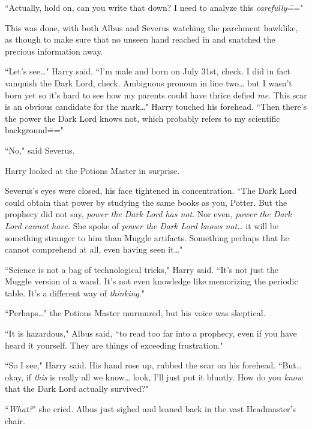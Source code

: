 ``Actually, hold on, can you write that down? I need to analyze this \emph{carefully}\==="

This was done, with both Albus and Severus watching the parchment hawklike, as though to make sure that no unseen hand reached in and snatched the precious information away.

``Let's see{\ldots}" Harry said. ``I'm male and born on July 31st, check. I did in fact vanquish the Dark Lord, check. Ambiguous pronoun in line two{\ldots} but I wasn't born yet so it's hard to see how my parents could have thrice defied \emph{me}. This scar is an obvious candidate for the mark{\ldots}" Harry touched his forehead. ``Then there's the power the Dark Lord knows not, which probably refers to my scientific background\==="

``No," said Severus.

Harry looked at the Potions Master in surprise.

Severus's eyes were closed, his face tightened in concentration. ``The Dark Lord could obtain that power by studying the same books as you, Potter. But the prophecy did not say, \emph{power the Dark Lord has not}. Nor even, \emph{power the Dark Lord cannot have}. She spoke of \emph{power the Dark Lord knows not{\ldots}} it will be something stranger to him than Muggle artifacts. Something perhaps that he cannot comprehend at all, even having seen it{\ldots}"

``Science is not a bag of technological tricks," Harry said. ``It's not just the Muggle version of a wand. It's not even knowledge like memorizing the periodic table. It's a different way of \emph{thinking}."

``Perhaps{\ldots}" the Potions Master murmured, but his voice was skeptical.

``It is hazardous," Albus said, ``to read too far into a prophecy, even if you have heard it yourself. They are things of exceeding frustration."

``So I see," Harry said. His hand rose up, rubbed the scar on his forehead. ``But{\ldots} okay, if \emph{this} is really all we know{\ldots} look, I'll just put it bluntly. How do you \emph{know} that the Dark Lord actually survived?"

``\emph{What?}" she cried. Albus just sighed and leaned back in the vast Headmaster's chair.


